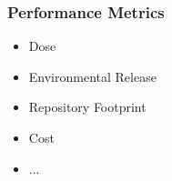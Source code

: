 
\begin{frame}
  \frametitle{Performance Metrics}
  \begin{itemize}
  \item Dose
  \item Environmental Release 
  \item Repository Footprint
  \item Cost
  \item ...
\end{itemize}
\end{frame}

